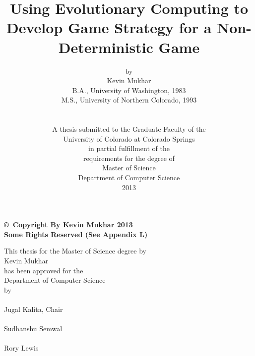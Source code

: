 
\title{\bf {\LARGE Using Evolutionary Computing to Develop Game Strategy for a Non-Deterministic Game}}
\author{by \\ Kevin Mukhar \\  B.A., University of Washington, 1983 \\ 
M.S., University of Northern Colorado, 1993 
\\
\\
\\ A thesis submitted to the Graduate Faculty of the \\
University of Colorado at Colorado Springs \\
in partial fulfillment of the \\
requirements for the degree of \\
Master of Science \\
Department of Computer Science \\
2013 }
\date{}

\maketitle

\setcounter{page}{2}

\newpage

\pagestyle{plain}

\begin{minipage}[t]{5.0in}
	\vspace{7.0in}
	\bf \copyright \ Copyright By Kevin Mukhar 2013 \\[-1.0pc]
	Some Rights Reserved (See Appendix L) \rm
\end{minipage}



\newpage

\begin{center}
	This thesis for the Master of Science degree by \\
	Kevin Mukhar \\
	has been approved for the \\
 	Department of Computer Science \\
	by \\ 
	\vspace{3.0pc}
	\makebox[3in]{\hrulefill} \\[-1.0pc]
	Jugal Kalita, Chair \\
	\vspace{3.0pc}
	\makebox[3in]{\hrulefill} \\[-1.0pc] 
	Sudhanshu Semwal \\
	\vspace{3.0pc}
	\makebox[3in]{\hrulefill} \\[-1.0pc] 
	Rory Lewis \\
\end{center}


